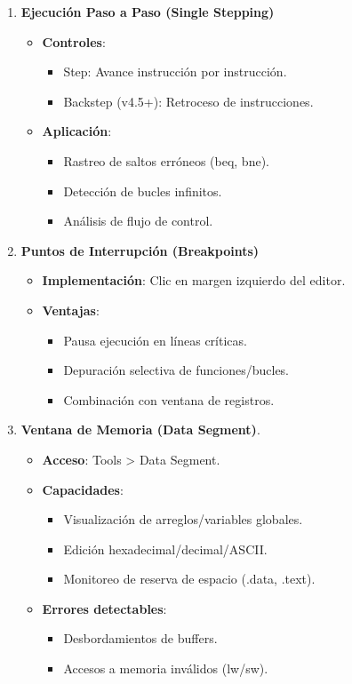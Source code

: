 \documentclass{article}
\begin{document}
\begin{itemize}
\begin{itemize}[label=--]
\begin{enumerate}[leftmargin=*]
    \item \textbf{Ejecución Paso a Paso (Single Stepping)}
    \begin{itemize}
        \item \textbf{Controles}:
        \begin{itemize}
            \item Step: Avance instrucción por instrucción.
            \item Backstep (v4.5+): Retroceso de instrucciones.
        \end{itemize}
        \item \textbf{Aplicación}:
        \begin{itemize}
            \item Rastreo de saltos erróneos (beq, bne).
            \item Detección de bucles infinitos.
            \item Análisis de flujo de control.
        \end{itemize}
    \end{itemize}

    \item \textbf{Puntos de Interrupción (Breakpoints)}
    \begin{itemize}
        \item \textbf{Implementación}: Clic en margen izquierdo del editor.
        \item \textbf{Ventajas}:
        \begin{itemize}
            \item Pausa ejecución en líneas críticas.
            \item Depuración selectiva de funciones/bucles.
            \item Combinación con ventana de registros.
        \end{itemize}
    \end{itemize}

    \item \textbf{Ventana de Memoria (Data Segment)}.
    \begin{itemize}
        \item \textbf{Acceso}: Tools > Data Segment.
        \item \textbf{Capacidades}:
        \begin{itemize}
            \item Visualización de arreglos/variables globales.
            \item Edición hexadecimal/decimal/ASCII.
            \item Monitoreo de reserva de espacio (.data, .text).
        \end{itemize}
        \item \textbf{Errores detectables}:
        \begin{itemize}
            \item Desbordamientos de buffers.
            \item Accesos a memoria inválidos (lw/sw).
        \end{itemize}
    \end{itemize}


\end{enumerate}
\end{itemize}
\end{itemize}
\end{document}
